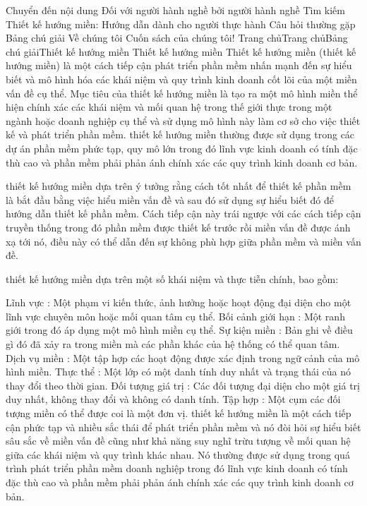 Chuyển đến nội dung
Đối với người hành nghề bởi người hành nghề
Tìm kiếm
Thiết kế hướng miền: Hướng dẫn dành cho người thực hành
Câu hỏi thường gặp
Bảng chú giải
Về chúng tôi
Cuốn sách của chúng tôi!
Trang chủTrang chủBảng chú giảiThiết kế hướng miền
Thiết kế hướng miền
Thiết kế hướng miền (thiết kế hướng miền) là một cách tiếp cận phát triển phần mềm nhấn mạnh đến sự hiểu biết và mô hình hóa các khái niệm và quy trình kinh doanh cốt lõi của một miền vấn đề cụ thể. Mục tiêu của thiết kế hướng miền là tạo ra một mô hình miền thể hiện chính xác các khái niệm và mối quan hệ trong thế giới thực trong một ngành hoặc doanh nghiệp cụ thể và sử dụng mô hình này làm cơ sở cho việc thiết kế và phát triển phần mềm. thiết kế hướng miền thường được sử dụng trong các dự án phần mềm phức tạp, quy mô lớn trong đó lĩnh vực kinh doanh có tính đặc thù cao và phần mềm phải phản ánh chính xác các quy trình kinh doanh cơ bản.

thiết kế hướng miền dựa trên ý tưởng rằng cách tốt nhất để thiết kế phần mềm là bắt đầu bằng việc hiểu miền vấn đề và sau đó sử dụng sự hiểu biết đó để hướng dẫn thiết kế phần mềm. Cách tiếp cận này trái ngược với các cách tiếp cận truyền thống trong đó phần mềm được thiết kế trước rồi miền vấn đề được ánh xạ tới nó, điều này có thể dẫn đến sự không phù hợp giữa phần mềm và miền vấn đề.

thiết kế hướng miền dựa trên một số khái niệm và thực tiễn chính, bao gồm:

Lĩnh vực : Một phạm vi kiến thức, ảnh hưởng hoặc hoạt động đại diện cho một lĩnh vực chuyên môn hoặc mối quan tâm cụ thể.
Bối cảnh giới hạn : Một ranh giới trong đó áp dụng một mô hình miền cụ thể.
Sự kiện miền : Bản ghi về điều gì đó đã xảy ra trong miền mà các phần khác của hệ thống có thể quan tâm.
Dịch vụ miền : Một tập hợp các hoạt động được xác định trong ngữ cảnh của mô hình miền.
Thực thể : Một lớp có một danh tính duy nhất và trạng thái của nó thay đổi theo thời gian.
Đối tượng giá trị : Các đối tượng đại diện cho một giá trị duy nhất, không thay đổi và không có danh tính.
Tập hợp : Một cụm các đối tượng miền có thể được coi là một đơn vị.
thiết kế hướng miền là một cách tiếp cận phức tạp và nhiều sắc thái để phát triển phần mềm và nó đòi hỏi sự hiểu biết sâu sắc về miền vấn đề cũng như khả năng suy nghĩ trừu tượng về mối quan hệ giữa các khái niệm và quy trình khác nhau. Nó thường được sử dụng trong quá trình phát triển phần mềm doanh nghiệp trong đó lĩnh vực kinh doanh có tính đặc thù cao và phần mềm phải phản ánh chính xác các quy trình kinh doanh cơ bản.

